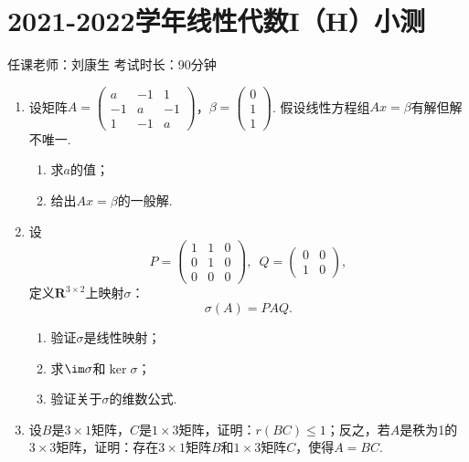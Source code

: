 \section{2021-2022学年线性代数I（H）小测}

\begin{center}
    任课老师：刘康生\hspace{4em} 考试时长：90分钟
\end{center}
\begin{enumerate}
    \item  设矩阵$A=\begin{pmatrix}
        a & -1 & 1 \\ -1 & a & -1 \\ 1 & -1 & a
    \end{pmatrix}$，$\beta=\begin{pmatrix}
        0 \\ 1 \\ 1
    \end{pmatrix}$. 假设线性方程组$Ax=\beta$有解但解不唯一.
    \begin{enumerate}
        \item 求$a$的值；

        \item 给出$Ax=\beta$的一般解.
    \end{enumerate}

    \item 设
    \[P=\begin{pmatrix}
        1 & 1 & 0 \\ 0 & 1 & 0 \\ 0 & 0 & 0
    \end{pmatrix},\enspace Q=\begin{pmatrix}
        0 & 0 \\ 1 & 0
    \end{pmatrix},\]
    定义$\mathbf{R}^{3\times 2}$上映射$\sigma$：
    \[\sigma(A)=PAQ.\]
    \begin{enumerate}
        \item 验证$\sigma$是线性映射；

        \item 求$\im\sigma$和$\ker\sigma$；

        \item 验证关于$\sigma$的维数公式.
    \end{enumerate}

    \item 设$B$是$3\times 1$矩阵，$C$是$1\times 3$矩阵，证明：$r(BC)\leqslant 1$；反之，若$A$是秩为1的$3\times 3$矩阵，证明：存在$3\times 1$矩阵$B$和$1\times 3$矩阵$C$，使得$A=BC$.


\end{enumerate}
